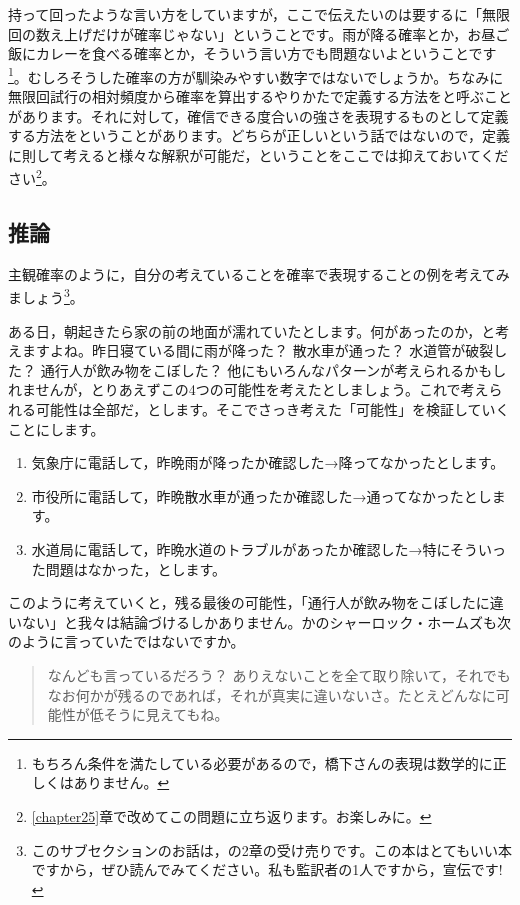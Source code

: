\documentclass{ltjbook}
\begin{document}
持って回ったような言い方をしていますが，ここで伝えたいのは要するに「無限回の数え上げだけが確率じゃない」ということです。雨が降る確率とか，お昼ご飯にカレーを食べる確率とか，そういう言い方でも問題ないよということです\footnote{もちろん条件を満たしている必要があるので，橋下さんの表現は数学的に正しくはありません。}。むしろそうした確率の方が馴染みやすい数字ではないでしょうか。ちなみに無限回試行の相対頻度から確率を算出するやりかたで定義する方法をと呼ぶことがあります。それに対して，確信できる度合いの強さを表現するものとして定義する方法をということがあります。どちらが正しいという話ではないので，定義に則して考えると様々な解釈が可能だ，ということをここでは抑えておいてください\footnote{\ref{chapter25}章で改めてこの問題に立ち返ります。お楽しみに。}。

\subsection{推論}
主観確率のように，自分の考えていることを確率で表現することの例を考えてみましょう\footnote{このサブセクションのお話は，\citet{Maeda2017}の2章の受け売りです。この本はとてもいい本ですから，ぜひ読んでみてください。私も監訳者の1人ですから，宣伝です!}。

ある日，朝起きたら家の前の地面が濡れていたとします。何があったのか，と考えますよね。昨日寝ている間に雨が降った？ 散水車が通った？ 水道管が破裂した？ 通行人が飲み物をこぼした？ 他にもいろんなパターンが考えられるかもしれませんが，とりあえずこの4つの可能性を考えたとしましょう。これで考えられる可能性は全部だ，とします。そこでさっき考えた「可能性」を検証していくことにします。
\begin{enumerate}
    \item 気象庁に電話して，昨晩雨が降ったか確認した→降ってなかったとします。
    \item 市役所に電話して，昨晩散水車が通ったか確認した→通ってなかったとします。
    \item 水道局に電話して，昨晩水道のトラブルがあったか確認した→特にそういった問題はなかった，とします。
\end{enumerate}
このように考えていくと，残る最後の可能性，「通行人が飲み物をこぼしたに違いない」と我々は結論づけるしかありません。かのシャーロック・ホームズも次のように言っていたではないですか。

\begin{quote}
    なんども言っているだろう？ ありえないことを全て取り除いて，それでもなお何かが残るのであれば，それが真実に違いないさ。たとえどんなに可能性が低そうに見えてもね。
\end{quote}
\end{document}

